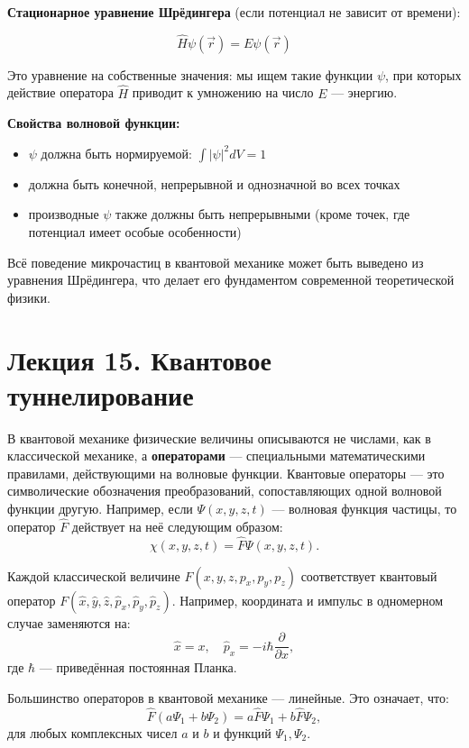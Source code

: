 \documentclass[12pt]{article}
\begin{document}
\textbf{Стационарное уравнение Шрёдингера} (если потенциал не зависит от времени):

\[
\hat{H} \psi(\vec{r}) = E \psi(\vec{r})
\]

Это уравнение на собственные значения: мы ищем такие функции $\psi$, при которых действие оператора $\hat{H}$ приводит к умножению на число $E$ — энергию.

\textbf{Свойства волновой функции:}
\begin{itemize}
    \item $\psi$ должна быть нормируемой: $\int |\psi|^2 dV = 1$
    \item должна быть конечной, непрерывной и однозначной во всех точках
    \item производные $\psi$ также должны быть непрерывными (кроме точек, где потенциал имеет особые особенности)
\end{itemize}

Всё поведение микрочастиц в квантовой механике может быть выведено из уравнения Шрёдингера, что делает его фундаментом современной теоретической физики.






\section{Лекция 15. Квантовое туннелирование}

В квантовой механике физические величины описываются не числами, как в классической механике, а \textbf{операторами} — специальными математическими правилами, действующими на волновые функции. Квантовые операторы — это символические обозначения преобразований, сопоставляющих одной волновой функции другую. Например, если $\Psi(x, y, z, t)$ — волновая функция частицы, то оператор $\hat{F}$ действует на неё следующим образом:
\[
\chi(x, y, z, t) = \hat{F} \Psi(x, y, z, t).
\]

Каждой классической величине $F(x, y, z, p_x, p_y, p_z)$ соответствует квантовый оператор $F(\hat{x}, \hat{y}, \hat{z}, \hat{p}_x, \hat{p}_y, \hat{p}_z)$. Например, координата и импульс в одномерном случае заменяются на:
\[
\hat{x} = x, \quad \hat{p}_x = -i\hbar \frac{\partial}{\partial x},
\]
где $\hbar$ — приведённая постоянная Планка.

Большинство операторов в квантовой механике — линейные. Это означает, что:
\[
\hat{F}(a\Psi_1 + b\Psi_2) = a\hat{F}\Psi_1 + b\hat{F}\Psi_2,
\]
для любых комплексных чисел $a$ и $b$ и функций $\Psi_1, \Psi_2$.
\end{document}

